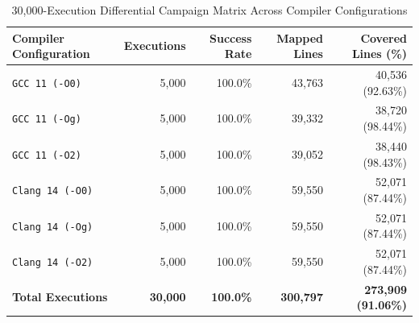 \begin{table}[h]
\centering
\caption{30,000-Execution Differential Campaign Matrix Across Compiler Configurations}
\label{tab:campaign_30k}
\begin{tabular}{lrrrr}
\toprule
\textbf{Compiler Configuration} & \textbf{Executions} & \textbf{Success Rate} & \textbf{Mapped Lines} & \textbf{Covered Lines (\%)} \\
\midrule
\texttt{GCC 11 (-O0)}           & 5,000 & 100.0\% & 43,763 & 40,536 (92.63\%) \\
\texttt{GCC 11 (-Og)}           & 5,000 & 100.0\% & 39,332 & 38,720 (98.44\%) \\
\texttt{GCC 11 (-O2)}           & 5,000 & 100.0\% & 39,052 & 38,440 (98.43\%) \\
\texttt{Clang 14 (-O0)}         & 5,000 & 100.0\% & 59,550 & 52,071 (87.44\%) \\
\texttt{Clang 14 (-Og)}         & 5,000 & 100.0\% & 59,550 & 52,071 (87.44\%) \\
\texttt{Clang 14 (-O2)}         & 5,000 & 100.0\% & 59,550 & 52,071 (87.44\%) \\
\midrule
\textbf{Total Executions}       & \textbf{30,000} & \textbf{100.0\%} & \textbf{300,797} & \textbf{273,909 (91.06\%)} \\
\bottomrule
\end{tabular}
\end{table}
